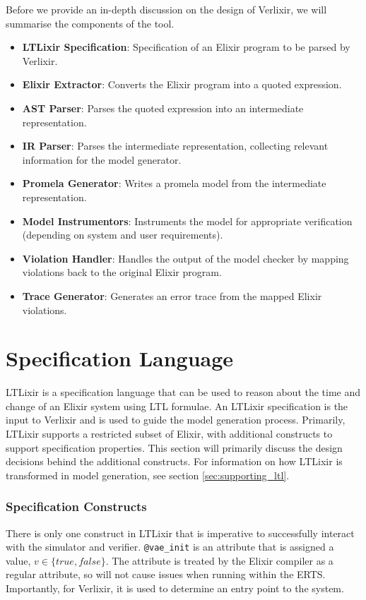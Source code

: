 Before we provide an in-depth discussion on the design of Verlixir, we will summarise the components of the tool.
\begin{itemize}
    \item \textbf{LTLixir Specification}: Specification of an Elixir program to be parsed by Verlixir.
    \item \textbf{Elixir Extractor}: Converts the Elixir program into a quoted expression.
    \item \textbf{AST Parser}: Parses the quoted expression into an intermediate representation.
    \item \textbf{IR Parser}: Parses the intermediate representation, collecting relevant information for the model generator.
    \item \textbf{Promela Generator}: Writes a promela model from the intermediate representation.
    \item \textbf{Model Instrumentors}: Instruments the model for appropriate verification (depending on system and user requirements).
    \item \textbf{Violation Handler}: Handles the output of the model checker by mapping violations back to the original Elixir program.
    \item \textbf{Trace Generator}: Generates an error trace from the mapped Elixir violations.
\end{itemize}
\section{Specification Language} \label{sec:specification_language}
LTLixir is a specification language that can be used to reason about the time and change of an Elixir system using LTL formulae. An LTLixir specification is the input to Verlixir and is used to guide the model generation process. Primarily, LTLixir supports a restricted subset of Elixir, with additional constructs to support specification properties. This section will primarily discuss the design decisions behind the additional constructs. For information on how LTLixir is transformed in model generation, see section \ref{sec:supporting_ltl}.
\par
\subsubsection{Specification Constructs}
There is only one construct in LTLixir that is imperative to successfully interact with the simulator and verifier. \texttt{@vae\_init} is an attribute that is assigned a value, $v \in \{true, false\}$. The attribute is treated by the Elixir compiler as a regular attribute, so will not cause issues when running within the ERTS. Importantly, for Verlixir, it is used to determine an entry point to the system.
\par
